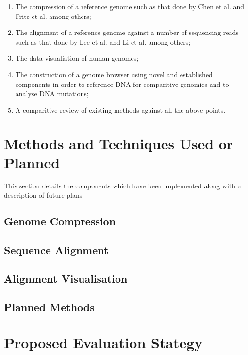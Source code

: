 \documentclass{csfyp}
\begin{document}
\begin{enumerate}[nolistsep]

   \item The compression of a reference genome such as that done by Chen et al. \cite{gencompress} and Fritz et al. \cite{refcompression} among others;

  \item The alignment of a reference genome against a number of sequencing reads such as that done by Lee et al. \cite{cgreads} and Li et al. \cite{bwtransform} among others;

  \item The data visualiation of human genomes;

  \item The construction of a genome browser using novel and established components in order to reference DNA for comparitive genomics and to analyse DNA mutations;  

  \item A comparitive review of existing methods against all the above points.

\end{enumerate}


\section{Methods and Techniques Used or Planned}

This section details the components which have been implemented along with a description of future plans.

\subsection{Genome Compression}

\subsection{Sequence Alignment}

\subsection{Alignment Visualisation}

\subsection{Planned Methods}


\section{Proposed Evaluation Stategy}
\end{document}
